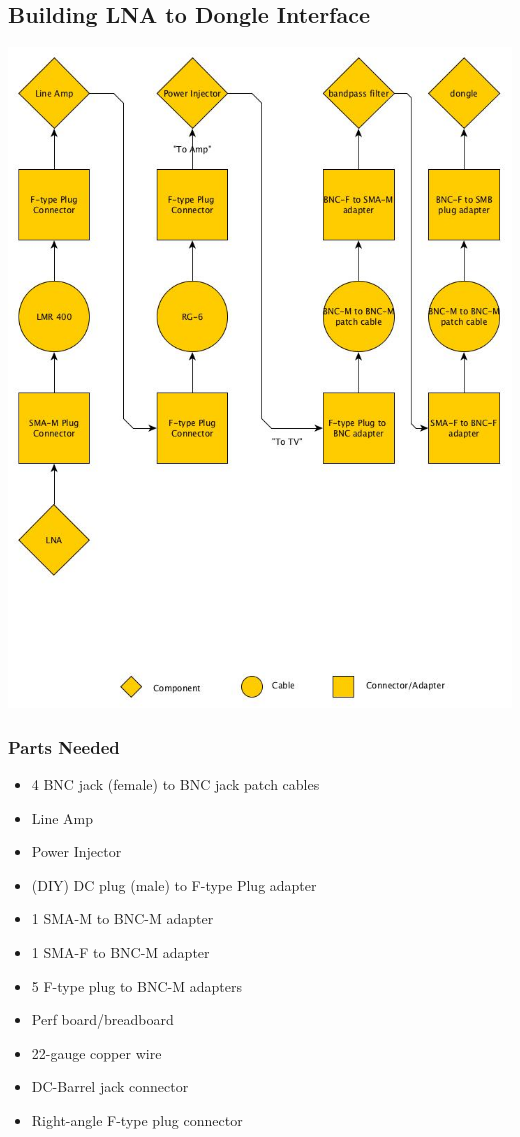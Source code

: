 \documentclass[11pt]{article} %
\begin{document}
\subsection{Building LNA to Dongle Interface}

\begin{center}
\includegraphics[scale=0.35]{lnainterface/01.jpeg}
\end{center}


\subsubsection{Parts Needed}

\begin{itemize}
\item 4 BNC jack (female) to BNC jack patch cables
\item Line Amp
\item Power Injector
\item (DIY) DC plug (male) to F-type Plug adapter
\item 1 SMA-M to BNC-M adapter
\item 1 SMA-F to BNC-M adapter
\item 5 F-type plug to BNC-M adapters
\item Perf board/breadboard
\item 22-gauge copper wire
\item DC-Barrel jack connector
\item Right-angle F-type plug connector
\end{itemize}
\end{document}
